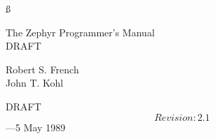 %
\ss
\vspace*{1.5in}

\begin{center}
{\Huge The Zephyr Programmer's Manual} \\
\vspace{.5in}
{\Large DRAFT}
\end{center}

\vspace*{.25in}

\begin{center}
{\Large Robert S. French \\
\vspace{1ex}
John T. Kohl}
\end{center}

\vspace*{.75in}

\begin{center}

{\huge DRAFT $$Revision: 2.1 $$---5 May 1989}
\end{center}



\ess
